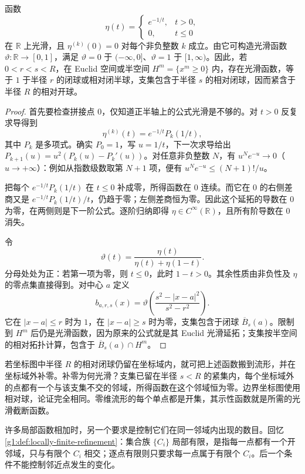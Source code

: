 \begin{lemma}\label{g1:lem:smooth-bump-function}
	函数
	\[
		\eta(t)=
		\begin{cases}
			e^{-1/t},&t>0,\\
			0,&t\le0
		\end{cases}
	\]
	在 \(\mathbb R\) 上光滑，且 \(\eta^{(k)}(0)=0\) 对每个非负整数 \(k\) 成立。由它可构造光滑函数 \(\vartheta:\mathbb R\to[0,1]\)，满足 \(\vartheta=0\) 于 \((-\infty,0]\)、\(\vartheta=1\) 于 \([1,\infty)\)。因此，若 \(0<r<s<R\)，在 Euclid 空间或半空间 \(H^m=\{x^m\ge0\}\) 内，存在光滑函数，等于 \(1\) 于半径 \(r\) 的闭球或相对闭半球，支集包含于半径 \(s\) 的相对闭球，因而紧含于半径 \(R\) 的相对开球。
\end{lemma}
\begin{proof}
	首先要检查拼接点 \(0\)，仅知道正半轴上的公式光滑是不够的。对 \(t>0\) 反复求导得到
	\[
		\eta^{(k)}(t)=e^{-1/t}P_k(1/t),
	\]
	其中 \(P_k\) 是多项式。确实 \(P_0=1\)，写 \(u=1/t\)，下一次求导给出 \(P_{k+1}(u)=u^2(P_k(u)-P_k'(u))\)。对任意非负整数 \(N\)，有 \(u^N e^{-u}\to0\)（\(u\to+\infty\)）：例如从指数级数取第 \(N+1\) 项，便有 \(u^N e^{-u}\le (N+1)!/u\)。

	把每个 \(e^{-1/t}P_k(1/t)\) 在 \(t\le0\) 补成零，所得函数在 \(0\) 连续。而它在 \(0\) 的右侧差商又是 \(e^{-1/t}P_k(1/t)/t\)，仍趋于零；左侧差商恒为零。因此这个延拓的导数在 \(0\) 为零，在两侧则是下一阶公式。逐阶归纳即得 \(\eta\in C^\infty(\mathbb R)\)，且所有阶导数在 \(0\) 消失。

	令
	\[
		\vartheta(t)=\frac{\eta(t)}{\eta(t)+\eta(1-t)}.
	\]
	分母处处为正：若第一项为零，则 \(t\le0\)，此时 \(1-t>0\)。其余性质由非负性及 \(\eta\) 的零点集直接得到。对中心 \(a\) 定义
	\[
		b_{a,r,s}(x)=
		\vartheta\!\left(\frac{s^2-|x-a|^2}{s^2-r^2}\right).
	\]
	它在 \(|x-a|\le r\) 时为 \(1\)，在 \(|x-a|\ge s\) 时为零，支集包含于闭球 \(\overline B_s(a)\)。限制到 \(H^m\) 后仍是光滑函数，因为原来的公式就是其 Euclid 光滑延拓；支集按半空间的相对拓扑计算，包含于 \(\overline B_s(a)\cap H^m\)。
\end{proof}

若坐标图中半径 \(R\) 的相对闭球仍留在坐标域内，就可把上述函数搬到流形，并在坐标域外补零。补零为何光滑？支集已留在半径 \(s<R\) 的紧集内，每个坐标域外的点都有一个与该支集不交的邻域，所得函数在这个邻域恒为零。边界坐标图使用相对球，论证完全相同。零维流形的每个单点都是开集，其示性函数就是所需的光滑截断函数。

\ProseParagraphBreak

许多局部函数相加时，另一个要求是控制它们在同一邻域内出现的数目。回忆\cref{g1:def:locally-finite-refinement}：集合族 \(\{C_i\}\) 局部有限，是指每一点都有一个开邻域，只与有限个 \(C_i\) 相交；逐点有限则只要求每一点属于有限个 \(C_i\)。后一个条件不能控制邻近点发生的变化。

